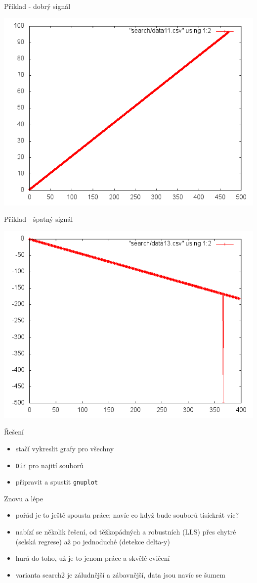\documentclass{beamer}
\begin{document}
\begin{frame}{Příklad - dobrý signál}
  \begin{center}
      \includegraphics[width=0.6\columnwidth]{search_good}
      \end{center}
\end{frame}
\begin{frame}{Příklad - špatný signál}
  \begin{center}
      \includegraphics[width=0.6\columnwidth]{search_bad}
      \end{center}
\end{frame}

\begin{frame}{Řešení}
  \begin{itemize}
    \item stačí vykreslit grafy pro všechny
    \item \texttt{Dir} pro najití souborů
    \item připravit a spustit \texttt{gnuplot}
  \end{itemize}
\end{frame}

\begin{frame}{Znovu a lépe}
  \begin{itemize}
    \item pořád je to ještě spousta práce; navíc co když bude souborů tisíckrát víc?
    \item nabízí se několik řešení, od těžkopádných a robustních (LLS) přes chytré (selská regrese) až po jednoduché (detekce delta-y)
    \item hurá do toho, už je to jenom práce a skvělé cvičení
    \item varianta search2 je záludnější a zábavnější, data jsou navíc se šumem
  \end{itemize}
\end{frame}
\end{document}
